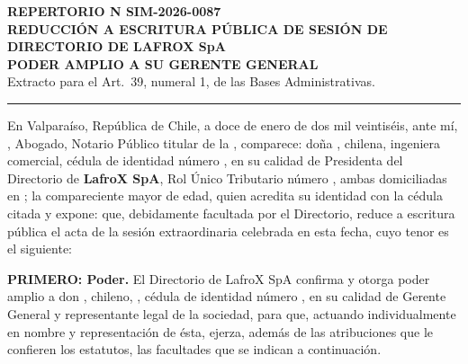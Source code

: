 \documentclass[11pt]{article}
\newcommand{\clau}[2]{\par\needspace{4\baselineskip}\textbf{#1.} #2\par}
\begin{document}
\begin{center}
\textbf{REPERTORIO N\textdegree{} SIM-2026-0087}\\[8pt]
\textbf{REDUCCIÓN A ESCRITURA PÚBLICA DE SESIÓN DE DIRECTORIO DE LAFROX SpA}\\
\textbf{PODER AMPLIO A SU GERENTE GENERAL}\\[6pt]
{\small Extracto para el Art.~39\textdegree, numeral 1, de las Bases Administrativas.}
\end{center}
\hrule\vspace{6pt}

En Valparaíso, República de Chile, a doce de enero de dos mil veintiséis, ante mí, \textbf{\MakeUppercase{\SIMnotarioTitular}}, Abogado, Notario Público titular de la \SIMnotaria, comparece: doña \textbf{\SIMpresidenta}, chilena, ingeniera comercial, cédula de identidad número \SIMpresidentarun, en su calidad de Presidenta del Directorio de \textbf{LafroX SpA}, Rol Único Tributario número \LFXrut, ambas domiciliadas en \LFXdomicilio; la compareciente mayor de edad, quien acredita su identidad con la cédula citada y expone: que, debidamente facultada por el Directorio, reduce a escritura pública el acta de la sesión extraordinaria celebrada en esta fecha, cuyo tenor es el siguiente:

\clau{PRIMERO: Poder}{El Directorio de LafroX SpA confirma y otorga poder amplio a don \textbf{\SIMgerente}, chileno, \SIMprofesion, cédula de identidad número \SIMgerenterun, en su calidad de Gerente General y representante legal de la sociedad, para que, actuando individualmente en nombre y representación de ésta, ejerza, además de las atribuciones que le confieren los estatutos, las facultades que se indican a continuación.}
\end{document}
